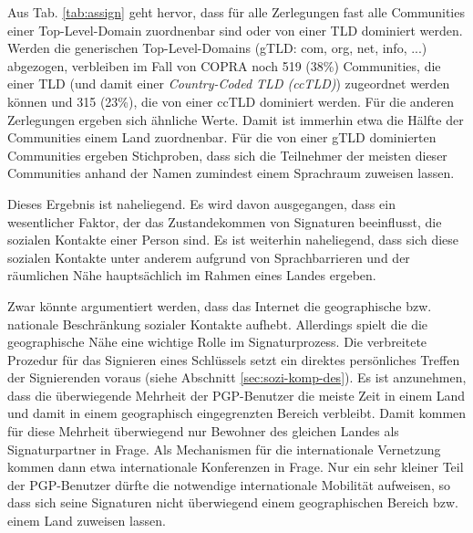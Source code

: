 Aus Tab. \ref{tab:assign} geht hervor, dass f\"ur alle Zerlegungen
fast alle Communities einer Top-Level-Domain zuordnenbar sind oder von
einer TLD dominiert werden. Werden die generischen Top-Level-Domains
(gTLD: com, org, net, info, ...) abgezogen, verbleiben im Fall von COPRA
noch 519 (38\%) Communities, die einer TLD (und damit einer
\emph{Country-Coded TLD (ccTLD)}) zugeordnet werden k\"onnen und 315
(23\%), die von einer ccTLD dominiert werden. F\"ur die anderen
Zerlegungen ergeben sich \"ahnliche Werte. Damit ist immerhin etwa die
H\"alfte der Communities einem Land zuordnenbar. F\"ur die von einer
gTLD dominierten Communities ergeben Stichproben, dass sich die
Teilnehmer der meisten dieser Communities anhand der Namen zumindest
einem Sprachraum zuweisen lassen.

Dieses Ergebnis ist naheliegend. Es wird davon ausgegangen, dass ein
wesentlicher Faktor, der das Zustandekommen von Signaturen
beeinflusst, die sozialen Kontakte einer Person sind. Es ist weiterhin
naheliegend, dass sich diese sozialen Kontakte unter anderem aufgrund
von Sprachbarrieren und der r\"aumlichen N\"ahe haupts\"achlich im
Rahmen eines Landes ergeben.

Zwar k\"onnte argumentiert werden, dass das Internet die geographische
bzw. nationale Beschr\"ankung sozialer Kontakte aufhebt. Allerdings
spielt die die geographische N\"ahe eine wichtige Rolle im
Signaturprozess. Die verbreitete Prozedur f\"ur das Signieren eines
Schl\"ussels setzt ein direktes pers\"onliches Treffen der
Signierenden voraus (siehe Abschnitt \ref{sec:sozi-komp-des}). Es ist
anzunehmen, dass die \"uberwiegende Mehrheit der PGP-Benutzer die
meiste Zeit in einem Land und damit in einem geographisch
eingegrenzten Bereich verbleibt. Damit kommen f\"ur diese Mehrheit
\"uberwiegend nur Bewohner des gleichen Landes als Signaturpartner in
Frage. Als Mechanismen f\"ur die internationale Vernetzung kommen dann
etwa internationale Konferenzen in Frage. Nur ein sehr kleiner Teil
der PGP-Benutzer d\"urfte die notwendige internationale Mobilit\"at
aufweisen, so dass sich seine Signaturen nicht \"uberwiegend einem
geographischen Bereich bzw. einem Land zuweisen lassen.

